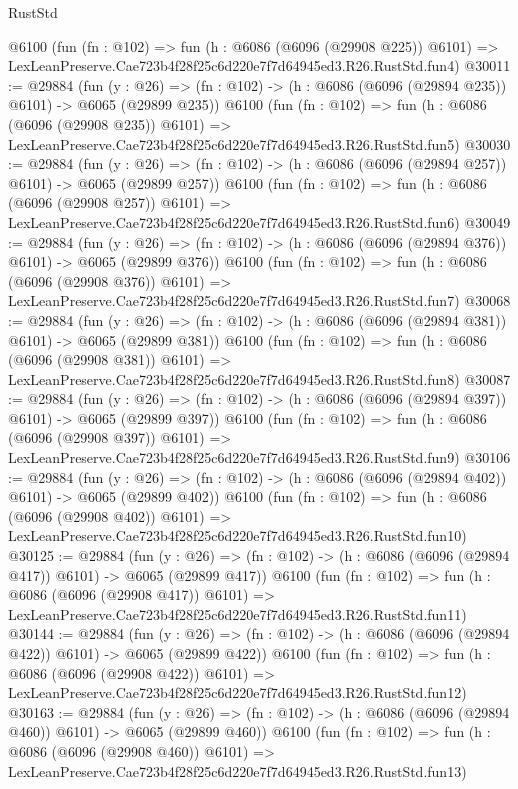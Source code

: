 \begin{lexlean}{RustStd}
\begin{coremodule}
    @6100
    (fun (fn : @102) =>
    fun (h : @6086 (@6096 (@29908 @225)) @6101) =>
    LexLeanPreserve.Cae723b4f28f25c6d220e7f7d64945ed3.R26.RustStd.fun4)
@30011 := @29884
    (fun (y : @26) => (fn : @102) -> (h : @6086 (@6096 (@29894 @235)) @6101) -> @6065 (@29899 @235))
    @6100
    (fun (fn : @102) =>
    fun (h : @6086 (@6096 (@29908 @235)) @6101) =>
    LexLeanPreserve.Cae723b4f28f25c6d220e7f7d64945ed3.R26.RustStd.fun5)
@30030 := @29884
    (fun (y : @26) => (fn : @102) -> (h : @6086 (@6096 (@29894 @257)) @6101) -> @6065 (@29899 @257))
    @6100
    (fun (fn : @102) =>
    fun (h : @6086 (@6096 (@29908 @257)) @6101) =>
    LexLeanPreserve.Cae723b4f28f25c6d220e7f7d64945ed3.R26.RustStd.fun6)
@30049 := @29884
    (fun (y : @26) => (fn : @102) -> (h : @6086 (@6096 (@29894 @376)) @6101) -> @6065 (@29899 @376))
    @6100
    (fun (fn : @102) =>
    fun (h : @6086 (@6096 (@29908 @376)) @6101) =>
    LexLeanPreserve.Cae723b4f28f25c6d220e7f7d64945ed3.R26.RustStd.fun7)
@30068 := @29884
    (fun (y : @26) => (fn : @102) -> (h : @6086 (@6096 (@29894 @381)) @6101) -> @6065 (@29899 @381))
    @6100
    (fun (fn : @102) =>
    fun (h : @6086 (@6096 (@29908 @381)) @6101) =>
    LexLeanPreserve.Cae723b4f28f25c6d220e7f7d64945ed3.R26.RustStd.fun8)
@30087 := @29884
    (fun (y : @26) => (fn : @102) -> (h : @6086 (@6096 (@29894 @397)) @6101) -> @6065 (@29899 @397))
    @6100
    (fun (fn : @102) =>
    fun (h : @6086 (@6096 (@29908 @397)) @6101) =>
    LexLeanPreserve.Cae723b4f28f25c6d220e7f7d64945ed3.R26.RustStd.fun9)
@30106 := @29884
    (fun (y : @26) => (fn : @102) -> (h : @6086 (@6096 (@29894 @402)) @6101) -> @6065 (@29899 @402))
    @6100
    (fun (fn : @102) =>
    fun (h : @6086 (@6096 (@29908 @402)) @6101) =>
    LexLeanPreserve.Cae723b4f28f25c6d220e7f7d64945ed3.R26.RustStd.fun10)
@30125 := @29884
    (fun (y : @26) => (fn : @102) -> (h : @6086 (@6096 (@29894 @417)) @6101) -> @6065 (@29899 @417))
    @6100
    (fun (fn : @102) =>
    fun (h : @6086 (@6096 (@29908 @417)) @6101) =>
    LexLeanPreserve.Cae723b4f28f25c6d220e7f7d64945ed3.R26.RustStd.fun11)
@30144 := @29884
    (fun (y : @26) => (fn : @102) -> (h : @6086 (@6096 (@29894 @422)) @6101) -> @6065 (@29899 @422))
    @6100
    (fun (fn : @102) =>
    fun (h : @6086 (@6096 (@29908 @422)) @6101) =>
    LexLeanPreserve.Cae723b4f28f25c6d220e7f7d64945ed3.R26.RustStd.fun12)
@30163 := @29884
    (fun (y : @26) => (fn : @102) -> (h : @6086 (@6096 (@29894 @460)) @6101) -> @6065 (@29899 @460))
    @6100
    (fun (fn : @102) =>
    fun (h : @6086 (@6096 (@29908 @460)) @6101) =>
    LexLeanPreserve.Cae723b4f28f25c6d220e7f7d64945ed3.R26.RustStd.fun13)

\end{coremodule}
\end{lexlean}
